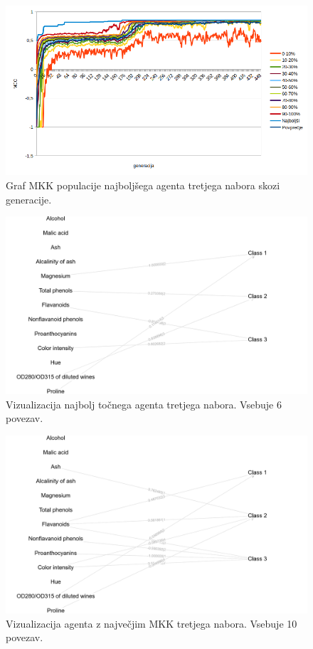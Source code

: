 \begin{figure}[H]
    \begin{center}
        \includegraphics[width=13cm]{wine/3/mcc}
    \end{center}
    \caption{Graf MKK populacije najboljšega agenta tretjega nabora skozi generacije.}
    \label{fig:wine_mcc_3}
\end{figure}

\begin{figure}[H]
    \begin{center}
        \includegraphics[width=13cm]{wine/3/acc_g}
    \end{center}
    \caption{Vizualizacija najbolj točnega agenta tretjega nabora. Vsebuje 6 povezav.}
    \label{fig:wine_acc_3_g}
\end{figure}

\begin{figure}[H]
    \begin{center}
        \includegraphics[width=13cm]{wine/3/mcc_g}
    \end{center}
    \caption{Vizualizacija agenta z največjim MKK tretjega nabora. Vsebuje 10 povezav.}
    \label{fig:wine_mcc_3_g}
\end{figure}